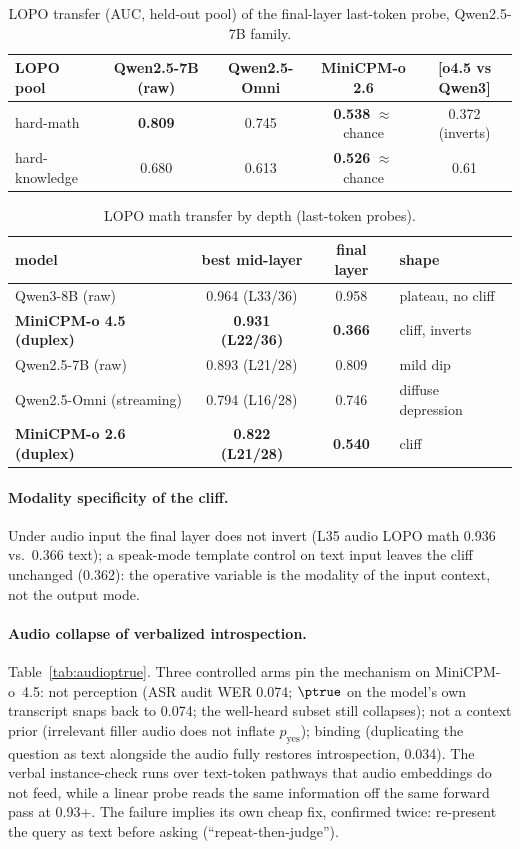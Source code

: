 \begin{table}[h]
\centering\small
\caption{LOPO transfer (AUC, held-out pool) of the final-layer
last-token probe, Qwen2.5-7B family.}
\label{tab:lopo}
\begin{tabular}{lcccc}
\toprule
LOPO pool & Qwen2.5-7B (raw) & Qwen2.5-Omni & MiniCPM-o 2.6 & [o4.5 vs Qwen3] \\
\midrule
hard-math & \textbf{0.809} & 0.745 & \textbf{0.538} $\approx$ chance & 0.372 (inverts) \\
hard-knowledge & 0.680 & 0.613 & \textbf{0.526} $\approx$ chance & 0.61 \\
\bottomrule
\end{tabular}
\end{table}

\begin{table}[h]
\centering\small
\caption{LOPO math transfer by depth (last-token probes).}
\label{tab:sweep}
\begin{tabular}{lccl}
\toprule
model & best mid-layer & final layer & shape \\
\midrule
Qwen3-8B (raw) & 0.964 (L33/36) & 0.958 & plateau, no cliff \\
\textbf{MiniCPM-o 4.5 (duplex)} & \textbf{0.931 (L22/36)} & \textbf{0.366} & cliff, inverts \\
Qwen2.5-7B (raw) & 0.893 (L21/28) & 0.809 & mild dip \\
Qwen2.5-Omni (streaming) & 0.794 (L16/28) & 0.746 & diffuse depression \\
\textbf{MiniCPM-o 2.6 (duplex)} & \textbf{0.822 (L21/28)} & \textbf{0.540} & cliff \\
\bottomrule
\end{tabular}
\end{table}

\paragraph{Modality specificity of the cliff.} Under audio input the
final layer does not invert (L35 audio LOPO math 0.936 vs.\ 0.366
text); a speak-mode template control on text input leaves the cliff
unchanged (0.362): the operative variable is the modality of the
input context, not the output mode.

\paragraph{Audio collapse of verbalized introspection.}
Table~\ref{tab:audioptrue}. Three controlled arms pin the mechanism on
MiniCPM-o~4.5: not perception (ASR audit WER 0.074; $\ptrue$ on
the model's own transcript snaps back to 0.074; the well-heard subset
still collapses); not a context prior (irrelevant filler audio
does not inflate $p_{\mathrm{yes}}$); binding (duplicating the
question as text alongside the audio fully restores introspection,
0.034). The verbal instance-check runs over text-token pathways that
audio embeddings do not feed, while a linear probe reads the same
information off the same forward pass at 0.93+. The failure implies its
own cheap fix, confirmed twice: re-present the query as text before
asking (``repeat-then-judge'').

